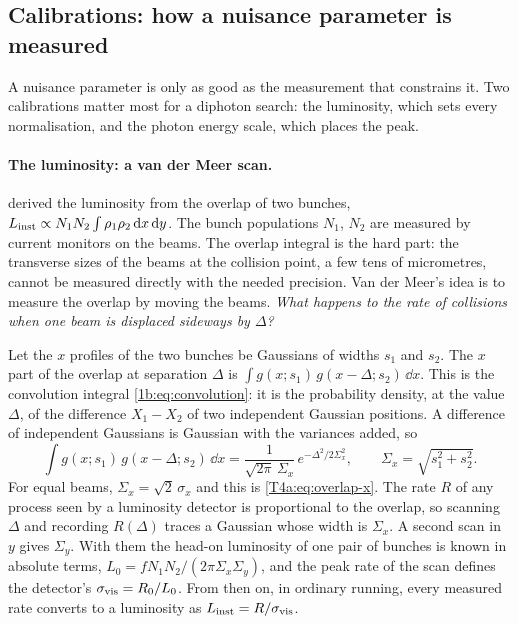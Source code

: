 \subsection{Calibrations: how a nuisance parameter is measured}
\label{T4a:sec:calib}

A nuisance parameter is only as good as the measurement that constrains it. Two calibrations matter most for a diphoton search: the luminosity, which sets every normalisation, and the photon energy scale, which places the peak.

\paragraph{The luminosity: a van der Meer scan.}
 derived the luminosity from the overlap of two bunches, $L_{\rm inst}\propto N_1N_2\int\rho_1\rho_2\,\mathrm{d} x\,\mathrm{d} y$. The bunch populations $N_1$, $N_2$ are measured by current monitors on the beams. The overlap integral is the hard part: the transverse sizes of the beams at the collision point, a few tens of micrometres, cannot be measured directly with the needed precision. Van der Meer's idea is to measure the overlap by moving the beams. \emph{What happens to the rate of collisions when one beam is displaced sideways by $\Delta$?}

Let the $x$ profiles of the two bunches be Gaussians of widths $s_1$ and $s_2$. The $x$ part of the overlap at separation $\Delta$ is $\int g(x;s_1)\,g(x-\Delta;s_2)\,\dd x$. This is the convolution integral \eqref{1b:eq:convolution}: it is the probability density, at the value $\Delta$, of the difference $X_1-X_2$ of two independent Gaussian positions. A difference of independent Gaussians is Gaussian with the variances added, so
\begin{equation}
  \int g(x;s_1)\,g(x-\Delta;s_2)\,\dd x
  =\frac{1}{\sqrt{2\pi}\,\Sigma_x}\,e^{-\Delta^2/2\Sigma_x^2},
  \qquad
  \Sigma_x=\sqrt{s_1^2+s_2^2} .
  \label{T4a:eq:vdm}
\end{equation}
For equal beams, $\Sigma_x=\sqrt2\,\sigma_x$ and this is \eqref{T4a:eq:overlap-x}. The rate $R$ of any process seen by a luminosity detector is proportional to the overlap, so scanning $\Delta$ and recording $R(\Delta)$ traces a Gaussian whose width is $\Sigma_x$. A second scan in $y$ gives $\Sigma_y$. With them the head-on luminosity of one pair of bunches is known in absolute terms, $L_0=fN_1N_2/(2\pi\Sigma_x\Sigma_y)$, and the peak rate of the scan defines the detector's  $\sigma_{\rm vis}=R_0/L_0$. From then on, in ordinary running, every measured rate converts to a luminosity as $L_{\rm inst}=R/\sigma_{\rm vis}$.


